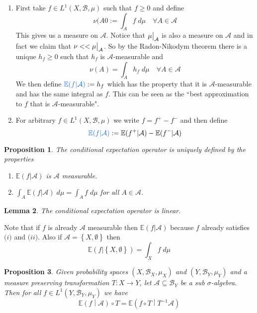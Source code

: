 \documentclass[11pt]{article}
\newcommand{\defeq}{:=}
\newcommand\restr[2]{{%
  \left.\kern-\nulldelimiterspace %
  #1 %
  \vphantom{\big|} %
  \right|_{#2} %
  }}
\newcommand{\relmiddle}[1]{\mathrel{}\middle#1\mathrel{}}
\newcommand{\rmv}{\relmiddle|}
\newcommand{\gvn}[2]{\ensuremath{\left(#1\rmv#2\right)}}
\newcommand{\expg}[2]{\ensuremath{\mathbb{E}\gvn{#1}{#2}}}
\newcommand{\dm}{\;d\mu}
\newcommand{\mdf}[1]{{\color{RoyalBlue} #1}}
\newtheorem{prop}{Proposition}[section]
\newtheorem{lemma}[prop]{Lemma}
\begin{document}
\begin{enumerate}
	\item First take $f\in L^1(X, \mathcal{B}, \mu)$ such that $f\geq 0$ and define
		\[
			\nu(A0 \defeq \int_A f \dm \quad \forall A\in\mathcal{A}
		\]
		This gives us a measure on $\mathcal{A}$.
		Notice that $\restr{\mu}{\mathcal{A}}$ is also a measure on $\mathcal{A}$ and in fact we claim that $\nu << \restr{\mu}{\mathcal{A}}$.
		So by the Radon-Nikodym theorem there is a unique $h_f \geq 0$ such that $h_f$ is $\mathcal{A}$-measurable and
		\[
			\nu(A) = \int_A h_f \dm \quad \forall A\in\mathcal{A}
		\]
		We then define $\mdf{\mathbb{E}(f | \mathcal{A})} \defeq h_f$ which has the property that it is $\mathcal{A}$-measurable and has the same integral as $f$.
		This can be seen as the ``best approximation to $f$ that is $\mathcal{A}$-measurable".
	\item For arbitrary $f\in L^1(X, \mathcal{B}, \mu)$ we write $f= f^+ - f^-$ and then define
		\[
			\mdf{\mathbb{E}(f | \mathcal{A})} \defeq \mathbb{E}(f^+ | \mathcal{A}) - \mathbb{E}(f^- | \mathcal{A})
		\]
\end{enumerate}

\begin{prop}
\label{prop:condexpec}
The conditional expectation operator is uniquely defined by the properties
\begin{enumerate}[label=(\roman*)]
	\item $\mathbb{E}(f | \mathcal{A})$ is $\mathcal{A}$ measurable.
	\item $\int_A \mathbb{E}(f | \mathcal{A})\dm = \int_A f \dm$ for all $A\in \mathcal{A}$.
\end{enumerate}
\end{prop}

\begin{lemma}
The conditional expectation operator is linear.
\end{lemma}

Note that if $f$ is already $\mathcal{A}$ measurable then $\mathbb{E}(f | \mathcal{A})$ because $f$ already satisfies $\textit{(i)}$ and $\textit{(ii)}$.
Also if $\mathcal{A}= \left\{ X, \emptyset\right\}$ then 
\[
	\mathbb{E}(f | \left\{ X, \emptyset\right\} ) = \int_X f \dm
\]

\begin{prop}
Given probability spaces $(X, \mathcal{B}_X, \mu_X)$ and $(Y, \mathcal{B}_Y, \mu_Y)$ and a measure preserving transformation $T:X \to Y$, let $\mathcal{A}\subseteq \mathcal{B}_Y$ be a sub $\sigma$-algebra.
Then for all $f\in L^1(Y, \mathcal{B}_Y, \mu_Y)$ we have
\[
	\expg{f }{ \mathcal{A}} \circ T = \expg{f \circ T}{T^{-1}\mathcal{A}}
\]
\end{prop}
\end{document}
